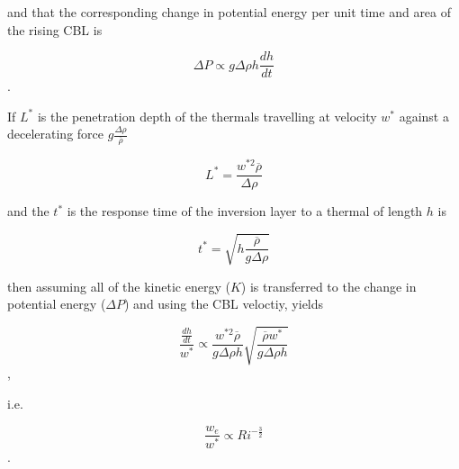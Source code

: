 and that the corresponding change in potential energy per unit time and area of the rising \acs{CBL} is

\begin{equation}
\Delta P \propto g \Delta \rho h \frac{d h}{ dt}  
\end{equation}.

If $L^{*}$ is the penetration depth of the thermals travelling at velocity $w^{*}$ against a decelerating force
$g \frac{\Delta \rho}{\overline{\rho}}$

\begin{equation}
L^{*} = \frac{w^{*2} \overline{\rho}}{\Delta \rho}  
\end{equation}

and the $t^{*}$ is the response time of the inversion layer to a thermal of length $h$ is

\begin{equation}
t^{*} = \sqrt{h \frac{\overline{\rho}}{g \Delta \rho}}  
\end{equation}

then assuming all of the kinetic energy ($K$) is transferred to the change in potential energy ($\Delta P$) and
using the \acs{CBL} veloctiy, yields




\begin{equation}
\frac{\frac{dh}{dt}}{w^{*}} \propto \frac{w^{*2} \overline{\rho}}{g \Delta \rho h} \sqrt{\frac{\overline{\rho} w^{*}}{g \Delta \rho h}}
\end{equation},

i.e.

\begin{equation}
\frac{w_{e}}{w^{*}} \propto Ri^{-\frac{3}{2}}
\end{equation}.

